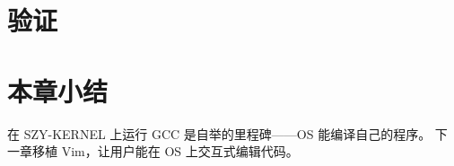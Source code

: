 \section{验证}
\label{sec:gcc-verify}


\section{本章小结}

在 SZY-KERNEL 上运行 GCC 是自举的里程碑——OS 能编译自己的程序。
下一章移植 Vim，让用户能在 OS 上交互式编辑代码。
